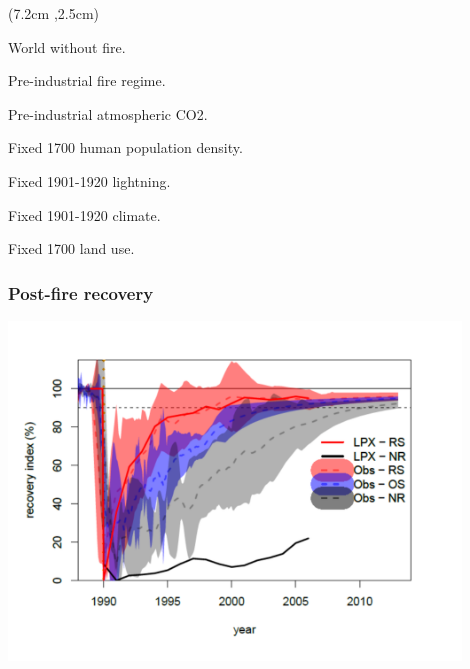 \begin{frame}[label = intro]
\begin{textblock*}{14cm}
		
	\end{textblock*}
	\begin{textblock*}{5.5cm}(7.2cm ,2.5cm)
		\begin{itemize}
			\small{
			\item World without fire. 
			\item Pre-industrial fire regime. 
			\item Pre-industrial atmospheric CO2. 
			\item Fixed 1700 human population density.
			\item Fixed 1901-1920 lightning. 
			\item Fixed 1901-1920 climate.
			\item Fixed 1700 land use.}
		\end{itemize}
	\end{textblock*}
	
\end{frame}



\begin{frame}
    \frametitle{Post-fire recovery}
    \includegraphics[width=12cm]{images/post-fireRec}%
\end{frame}


